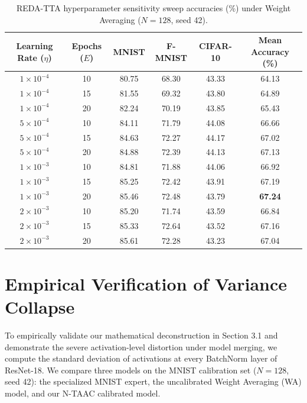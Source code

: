 \documentclass{article}
\theoremstyle{plain}
\theoremstyle{definition}
\theoremstyle{remark}
\begin{document}
\begin{table}[h]
  \caption{REDA-TTA hyperparameter sensitivity sweep accuracies (\%) under Weight Averaging ($N=128$, seed 42).}
  \label{tab:tta_sweep}
  \centering
  \small
  \begin{tabular}{cccccc}
    \toprule
    Learning Rate ($\eta$) & Epochs ($E$) & MNIST & F-MNIST & CIFAR-10 & Mean Accuracy (\%) \\
    \midrule
    $1 \times 10^{-4}$ & 10 & 80.75 & 68.30 & 43.33 & 64.13 \\
    $1 \times 10^{-4}$ & 15 & 81.55 & 69.32 & 43.80 & 64.89 \\
    $1 \times 10^{-4}$ & 20 & 82.24 & 70.19 & 43.85 & 65.43 \\
    \midrule
    $5 \times 10^{-4}$ & 10 & 84.11 & 71.79 & 44.08 & 66.66 \\
    $5 \times 10^{-4}$ & 15 & 84.63 & 72.27 & 44.17 & 67.02 \\
    $5 \times 10^{-4}$ & 20 & 84.88 & 72.39 & 44.13 & 67.13 \\
    \midrule
    $1 \times 10^{-3}$ & 10 & 84.81 & 71.88 & 44.06 & 66.92 \\
    $1 \times 10^{-3}$ & 15 & 85.25 & 72.42 & 43.91 & 67.19 \\
    $1 \times 10^{-3}$ & 20 & 85.46 & 72.48 & 43.79 & \textbf{67.24} \\
    \midrule
    $2 \times 10^{-3}$ & 10 & 85.20 & 71.74 & 43.59 & 66.84 \\
    $2 \times 10^{-3}$ & 15 & 85.33 & 72.64 & 43.52 & 67.16 \\
    $2 \times 10^{-3}$ & 20 & 85.61 & 72.28 & 43.23 & 67.04 \\
    \bottomrule
  \end{tabular}
\end{table}

\section{Empirical Verification of Variance Collapse}
\label{app:variance_collapse_verification}

To empirically validate our mathematical deconstruction in Section 3.1 and demonstrate the severe activation-level distortion under model merging, we compute the standard deviation of activations at every BatchNorm layer of ResNet-18. We compare three models on the MNIST calibration set ($N=128$, seed 42): the specialized MNIST expert, the uncalibrated Weight Averaging (WA) model, and our N-TAAC calibrated model.
\end{document}

